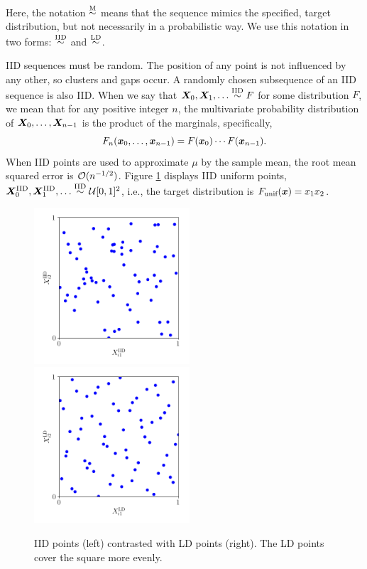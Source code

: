 \documentclass[graybox,footinfo]{svmult}
\newcommand{\IID}{\textup{IID}}
\newcommand{\LD}{\textup{LD}}
\newcommand{\unif}{\textup{unif}}
\newcommand{\IIDsim}{\overset{\IID}{\sim}}
\newcommand{\LDsim}{\overset{\LD}{\sim}}
\newcommand{\Msim}{\overset{\textup{M}}{\sim}}
\begin{document}
Here, the notation $\Msim$ means that the sequence mimics the specified, target distribution, but not necessarily in a probabilistic way.  We  use this notation in two forms:  $\IIDsim$ and $\LDsim$.

IID sequences must be random. The position of any point is not influenced by any other, so clusters and gaps occur.  A randomly chosen subsequence of an IID sequence is also IID.  When we say that $\bsX_0, \bsX_1, \ldots \IIDsim F$ for some distribution $F$, we mean that for any positive integer $n$, the  multivariate probability distribution of ${\boldsymbol{X}}_0, \ldots, {\boldsymbol{X}}_{n-1}$ is the product of the marginals, specifically,
\begin{equation*}
	F_{n}({\boldsymbol{x}}_0, \ldots, {\boldsymbol{x}}_{n-1}) = F({\boldsymbol{x}}_0) \cdots  F({\boldsymbol{x}}_{n-1}).
\end{equation*}
When IID points are used to approximate $\mu$ by the sample mean, the root mean squared error is ${\mathcal{O}}(n^{-1/2})$.  Figure \ref{fig:comparePts} displays IID uniform points, $\bsX^{\IID}_0, \bsX^{\IID}_1, \ldots \IIDsim \calU[0,1]^2$, i.e.,  the target distribution is $F_\unif(\bsx) = x_1 x_2$.


\begin{figure}[t]
	\includegraphics[height=5.8cm]{QMCSoftwareArticle/figs/dd_iid_uniform_pts.png}
	\quad
	\includegraphics[height=5.8cm]{QMCSoftwareArticle/figs/dd_sobol_pts.png}
	\caption{IID points (left) contrasted with LD points (right).  The LD points cover the square more evenly.}
	\label{fig:comparePts}
\end{figure}
\end{document}
